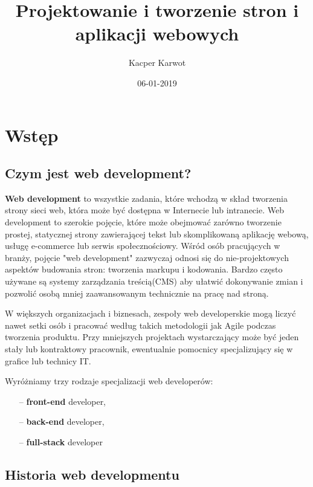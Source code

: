 \documentclass[12pt]{report}
\title{Projektowanie i tworzenie stron i aplikacji webowych}
\date{06-01-2019}
\author{Kacper Karwot}
\begin{document}
	\maketitle
	\tableofcontents
	\newpage
	\chapter{Wstęp}
	\section{Czym jest web development?}
	\textbf{Web development} to wszystkie zadania, które wchodzą w skład tworzenia strony sieci web, która może być dostępna w Internecie lub intranecie. 
	Web development to szerokie pojęcie, które może obejmować zarówno tworzenie prostej, statycznej strony zawierającej tekst lub 			skomplikowaną aplikację webową, usługę e-commerce lub serwis społecznościowy. 
 Wśród osób pracujących w branży, pojęcie "web development" zazwyczaj odnosi się do nie-projektowych aspektów budowania stron: tworzenia markupu i kodowania. Bardzo często używane są systemy zarządzania treścią(CMS) aby ułatwić dokonywanie zmian i pozwolić osobą mniej zaawansowanym technicznie na pracę nad stroną.
 	\par
 		W większych organizacjach i biznesach, zespoły web developerskie mogą liczyć nawet setki osób i pracować według takich metodologii jak Agile podczas tworzenia produktu. Przy mniejszych projektach wystarczający może być jeden stały lub kontraktowy pracownik, ewentualnie pomocnicy specjalizujący się w grafice lub technicy IT. 
	\begin{center}
	Wyróżniamy trzy rodzaje specjalizacji web developerów:
	
	\begin{itemize}
	\item[--] \textbf{front-end} developer,
	\item[--] \textbf{back-end} developer,
	\item[--] \textbf{full-stack} developer
 	\end{itemize}
 	\end{center}
 	
 	\cite{wiki:1}
 	
 	\newpage
	\section{Historia web developmentu}
	
\end{document}
